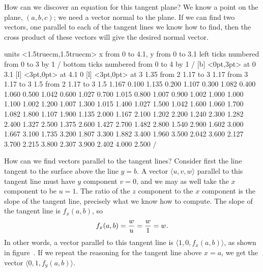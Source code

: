 How can we discover an equation for this tangent plane? We know a
point on the plane, $(a,b,c)$; we need a vector normal to the
plane. If we can find two vectors, one parallel to each of the tangent
lines we know how to find, then the cross product of these vectors
will give the desired normal vector.

\figure
\vbox{\beginpicture
\normalgraphs
\ninepoint
\setcoordinatesystem units <1.5truecm,1.5truecm>
\setplotarea x from 0 to 4.1, y from 0 to 3.1
\axis left ticks numbered from 0 to 3 by 1 /
\axis bottom ticks numbered from 0 to 4 by 1 /
 [b] <0pt,3pt> at 0 3.1
 [l] <3pt,0pt> at 4.1 0
 [l] <3pt,0pt> at 3 1.35
\putrule from 2 1.17 to 3 1.17
\putrule from 3 1.17 to 3 1.5
\setlinear
\arrow <5pt> [0.17, 0.5] from 2 1.17 to 3 1.5
\setquadratic
{} 1.167 0.100 1.135 0.200 1.107 0.300 1.082 0.400 1.060 
0.500 1.042 0.600 1.027 0.700 1.015 0.800 1.007 0.900 1.002 
1.000 1.000 1.100 1.002 1.200 1.007 1.300 1.015 1.400 1.027 
1.500 1.042 1.600 1.060 1.700 1.082 1.800 1.107 1.900 1.135 
2.000 1.167 2.100 1.202 2.200 1.240 2.300 1.282 2.400 1.327 
2.500 1.375 2.600 1.427 2.700 1.482 2.800 1.540 2.900 1.602 
3.000 1.667 3.100 1.735 3.200 1.807 3.300 1.882 3.400 1.960 
3.500 2.042 3.600 2.127 3.700 2.215 3.800 2.307 3.900 2.402 
4.000 2.500 /
\endpicture}

How can we find vectors parallel to the tangent lines? Consider first
the line tangent to the surface above the line $y=b$. A vector
$\langle u,v,w\rangle$ parallel to this tangent line must have $y$
component $v=0$, and we may as well take the $x$ component to be
$u=1$. The ratio of the $z$ component to the $x$ component is the
slope of the tangent line, precisely what we know how to compute. The
slope of the tangent line is $f_x(a,b)$, so
$$ f_x(a,b)={w\over u} ={w\over1} = w.$$
In other words, a vector parallel to this tangent line is
$\langle 1,0,f_x(a,b)\rangle$, as shown in figure~. 
If we repeat the reasoning for the
tangent line above $x=a$, we get the vector $\langle
0,1,f_y(a,b)\rangle$.

